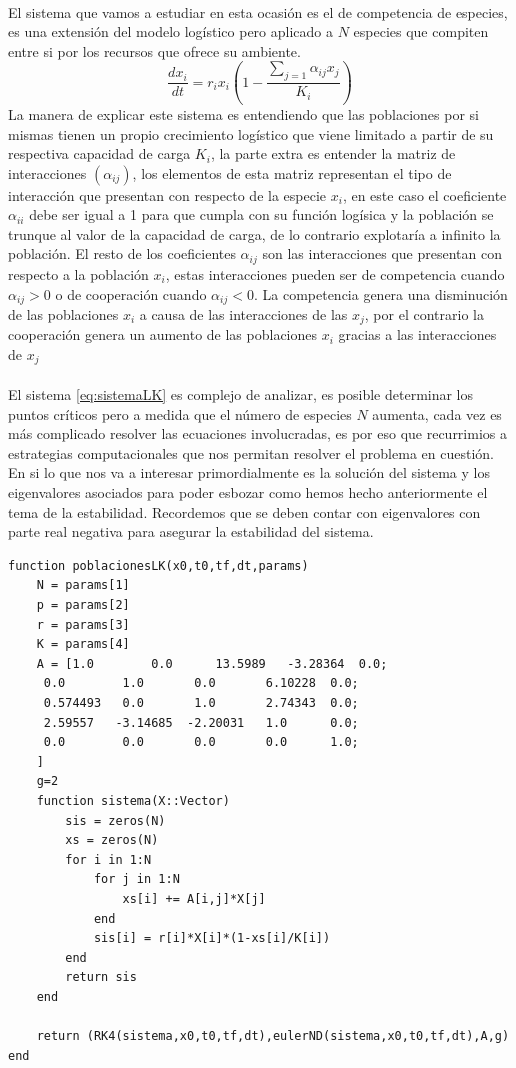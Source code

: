 \documentclass[11pt,a4paper]{article}
\begin{document}
\\
El sistema que vamos a estudiar en esta ocasión es el de competencia de especies, es una extensión del modelo logístico pero aplicado a $N$ especies que compiten entre si por los recursos que ofrece su ambiente.
\begin{equation}\label{eq:sistemaLK}
\frac{dx_i}{dt}=r_ix_i\left (1-\frac{\sum_{j=1}\alpha_{ij}x_j}{K_i}\right )
\end{equation}
La manera de explicar este sistema es entendiendo que las poblaciones por si mismas tienen un propio crecimiento logístico que viene limitado a partir de su respectiva capacidad de carga $K_i$, la parte extra es entender la matriz de interacciones $(\alpha_{ij})$, los elementos de esta matriz representan el tipo de interacción que  presentan con respecto de la especie $x_i$, en este caso el coeficiente $\alpha_{ii}$ debe ser igual a 1 para que cumpla con su función logísica y la población se trunque al valor de la capacidad de carga, de lo contrario explotaría a infinito la población. El resto de los coeficientes $\alpha_{ij}$ son las interacciones que presentan con respecto a la población $x_i$, estas interacciones pueden ser de competencia cuando $\alpha_{ij}>0$ o de cooperación cuando $\alpha_{ij}<0$. La competencia genera una disminución de las poblaciones $x_i$ a causa de las interacciones de las $x_j$, por el contrario la cooperación genera un aumento de las poblaciones $x_i$ gracias a las interacciones de $x_j$\\
\\
El sistema \ref{eq:sistemaLK} es complejo de analizar, es posible determinar los puntos críticos pero a medida que el número de especies $N$ aumenta, cada vez es más complicado resolver las ecuaciones involucradas, es por eso que recurrimios a estrategias computacionales que nos permitan resolver el problema en cuestión. En si lo que nos va a interesar primordialmente es la solución del sistema y los eigenvalores asociados para poder esbozar como hemos hecho anteriormente el tema de la estabilidad. Recordemos que se deben contar con eigenvalores con parte real negativa para asegurar la estabilidad del sistema.
\begin{verbatim}
function poblacionesLK(x0,t0,tf,dt,params)
    N = params[1]
    p = params[2]
    r = params[3]
    K = params[4]
    A = [1.0        0.0      13.5989   -3.28364  0.0;
     0.0        1.0       0.0       6.10228  0.0;
     0.574493   0.0       1.0       2.74343  0.0;
     2.59557   -3.14685  -2.20031   1.0      0.0;
     0.0        0.0       0.0       0.0      1.0;
    ]
    g=2 
    function sistema(X::Vector)
        sis = zeros(N)
        xs = zeros(N)
        for i in 1:N
            for j in 1:N
                xs[i] += A[i,j]*X[j]
            end
            sis[i] = r[i]*X[i]*(1-xs[i]/K[i])
        end
        return sis
    end
    
    return (RK4(sistema,x0,t0,tf,dt),eulerND(sistema,x0,t0,tf,dt),A,g)
end
\end{verbatim}
\end{document}

